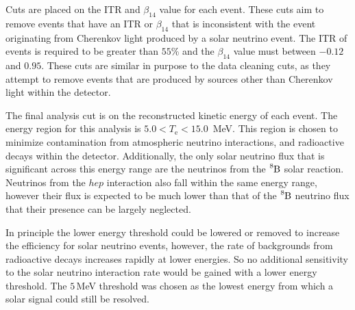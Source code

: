 Cuts are placed on the ITR and $\beta_{14}$ value for each event.
These cuts aim to remove events
that have an ITR or $\beta_{14}$ 
that is inconsistent with the event originating from Cherenkov light produced
by a solar neutrino event.
The ITR of events is required to be greater than $55$\% and the $\beta_{14}$
value must between $-0.12$ and $0.95$.
These cuts are similar in purpose to the data cleaning cuts, as they attempt to
remove events that are produced by sources other than Cherenkov light within
the detector.

The final analysis cut is on the reconstructed kinetic energy of each event.
The energy region for this analysis is $5.0 < T_{\mathrm{e}} < 15.0$\, MeV.
This region is chosen to minimize contamination from atmospheric neutrino
interactions, and radioactive decays within the detector.
Additionally, the only solar neutrino flux that is significant across this energy range
are the neutrinos from the $\ce{^{8}B}$ solar reaction.
Neutrinos from the $hep$ interaction also fall within the same energy range,
however their flux is expected to be much lower than that of the $\ce{^{8}B}$
neutrino flux that their presence can be largely neglected.

In principle the lower energy threshold could be lowered or removed to
increase the efficiency for solar neutrino events, however,
the rate of backgrounds from radioactive decays increases rapidly at lower
energies. So no additional sensitivity to the solar neutrino interaction
rate would be gained with a lower energy threshold.
The $5$\,MeV threshold was chosen as the lowest energy from which a solar
signal could still be resolved.


